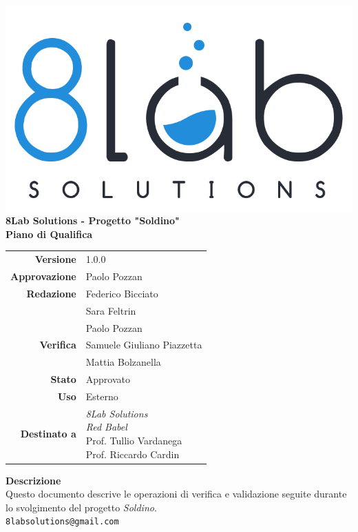\thispagestyle{empty}
\begin{titlepage}
	\begin{center}
		\includegraphics[scale = 0.3]{res/images/logo8_crop.png}\\
		\large \textbf{8Lab Solutions - Progetto "Soldino"} \\
		\vfill
		\Huge \textbf{Piano di Qualifica}
		\vspace*{\fill} 
        \vfill
        \large
        \begin{tabular}{r|l}
                        \textbf{Versione} & 1.0.0\\
                        \textbf{Approvazione} & Paolo Pozzan\\
                        \textbf{Redazione} & Federico Bicciato\\&
                        	Sara Feltrin\\&
                        	Paolo Pozzan\\
                        \textbf{Verifica} & Samuele Giuliano Piazzetta \\&
                        	Mattia Bolzanella\\
                        \textbf{Stato} & Approvato\\
                        \textbf{Uso} & Esterno\\
                        \textbf{Destinato a} & \parbox[t]{5cm}{\textit{8Lab Solutions}\\\textit{Red Babel}\\Prof. Tullio Vardanega\\Prof. Riccardo Cardin}
                \end{tabular}
                \vfill
                \normalsize
                \textbf{Descrizione}\\
                Questo documento descrive le operazioni di verifica e validazione seguite durante lo svolgimento del progetto \textit{Soldino}.\\
                \vfill
                \small
                \texttt{8labsolutions@gmail.com}
	\end{center}
\end{titlepage}